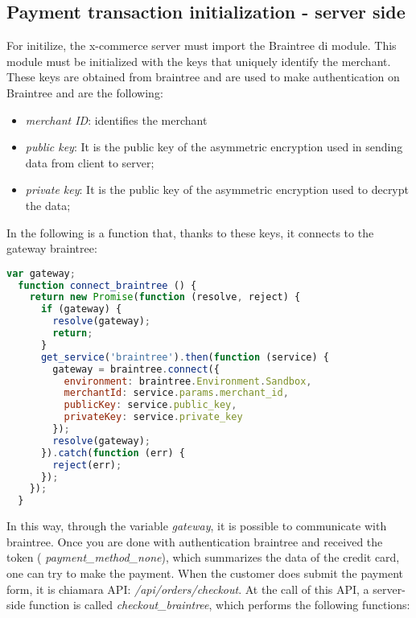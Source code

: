 \subsection{Payment transaction initialization - server side}
For initilize, the x-commerce server must import the Braintree di module.
This module must be initialized with the keys that uniquely identify the merchant.
\newline
These keys are obtained from braintree and are used to make authentication on Braintree and are the following:
\begin{itemize}
\item \emph{merchant ID}: identifies the merchant
\item \emph{public key}: It is the public key of the asymmetric encryption used in sending data from client to server;
\item \emph{private key}: It is the public key of the asymmetric encryption used to decrypt the data;
\end{itemize}
In the following is a function that, thanks to these keys, it connects to the gateway braintree:
\begin{lstlisting}[language=javascript]
  var gateway;
  function connect_braintree () {
    return new Promise(function (resolve, reject) {
      if (gateway) {
        resolve(gateway);
        return;
      }
      get_service('braintree').then(function (service) {
        gateway = braintree.connect({
          environment: braintree.Environment.Sandbox,
          merchantId: service.params.merchant_id,
          publicKey: service.public_key,
          privateKey: service.private_key
        });
        resolve(gateway);
      }).catch(function (err) {
        reject(err);
      });
    });
  }
\end{lstlisting}
In this way, through the variable \emph{gateway}, it is possible to communicate with braintree.
\newline
Once you are done with authentication braintree and received the token ( \emph{payment\_method\_none}), which summarizes the data of the credit card, one can try to make the payment.
\newline
When the customer does submit the payment form, it is chiamara API: \emph{/api/orders/checkout}.
At the call of this API, a server-side function is called \emph{checkout\_braintree}, which performs the following functions:

